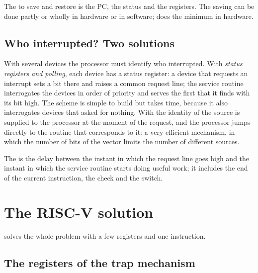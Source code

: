 The  to save and restore is the PC, the status and the
registers. The saving can be done partly or wholly in hardware or in
software; \riscv does the minimum in hardware.

\subsection{Who interrupted? Two solutions}

With several devices the processor must identify who interrupted. With
\emph{status registers and polling}, each device has a status register: a
device that requests an interrupt sets a bit there and raises a common request
line; the service routine interrogates the devices in order of priority and
serves the first that it finds with its bit high. The scheme is simple to
build but takes time, because it also interrogates devices that asked for
nothing. With  the identity of the source is
supplied to the processor at the moment of the request, and the processor
jumps directly to the routine that corresponds to it: a very efficient
mechanism, in which the number of bits of the vector limits the number of
different sources.

The  is the delay between the instant in which the
request line goes high and the instant in which the service routine starts
doing useful work; it includes the end of the current instruction, the check
and the switch.

\section{The RISC-V solution}

\riscv solves the whole problem with a few registers and one instruction.

\subsection{The registers of the trap mechanism}

